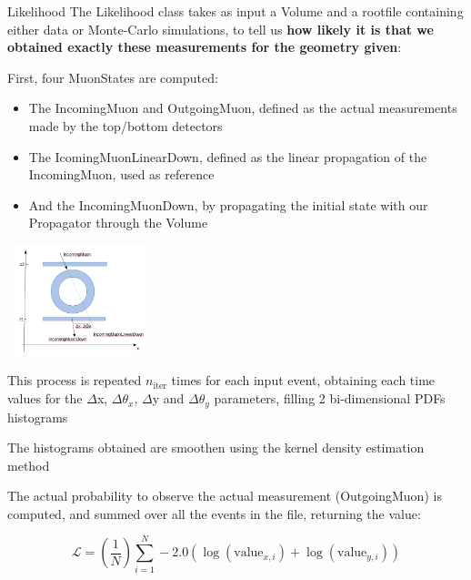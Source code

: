 \documentclass[8 pt]{beamer}
\begin{document}
\begin{frame}{Likelihood}
\justifying
The Likelihood class takes as input a Volume and a rootfile containing either data or Monte-Carlo simulations, to tell us \textbf{how likely it is that we obtained exactly these measurements for the geometry given}: \begin{itemize}

\begin{minipage}[c]{.58\textwidth}
\item First, four MuonStates are computed:
	\begin{itemize}
	\justifying
	\item The IncomingMuon and OutgoingMuon, defined as the actual measurements made by the top/bottom detectors
	\item The IcomingMuonLinearDown, defined as the linear propagation of the IncomingMuon, used as reference
	\item And the IncomingMuonDown, by propagating the initial state with our Propagator through the Volume
	\end{itemize}
\end{minipage}
\begin{minipage}[c]{.36\textwidth}
\includegraphics[width=4.3cm, height=3.2cm]{figs/parameters.png}
\end{minipage}

\justifying
\item This process is repeated $n_{\text{iter}}$ times for each input event, obtaining each time values for the $\Delta$x, $\Delta \theta_x$, $\Delta$y and $\Delta \theta_y$ parameters, filling 2 bi-dimensional PDFs histograms
\item The histograms obtained are smoothen using the kernel density estimation method
\item The actual probability to observe the actual measurement (OutgoingMuon) is computed, and summed over all the events in the file, returning the value:

\begin{equation*}
\label{eq:totallikelihood}
\mathcal{L} = \left( \frac{1}{N} \right) \sum_{i = 1}^N -2.0 \left ( \log(\text{value}_{x, i}) + \log(\text{value}_{y, i}) \right)
\end{equation*}
\end{itemize} \vfill
\end{frame}
\end{document}
